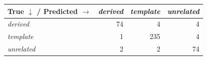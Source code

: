 \begin{tabular}{lrrr}
\toprule
True $\downarrow$ / Predicted $\rightarrow$ & \textit{derived} & \textit{template} & \textit{unrelated} \\
\midrule
\textit{derived} & 74 & 4 & 4 \\
\textit{template} & 1 & 235 & 4 \\
\textit{unrelated} & 2 & 2 & 74 \\
\bottomrule
\end{tabular}
